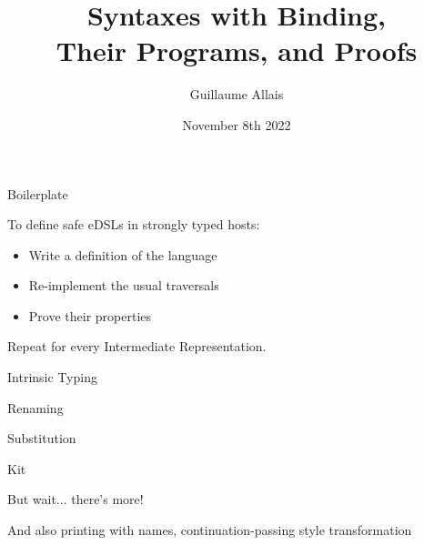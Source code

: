 \documentclass{beamer}
\title{Syntaxes with Binding,\\ Their Programs, and Proofs}
\author{Guillaume Allais}
\institute{University of Strathclyde}
\date{November 8th 2022}
\begin{document}
\maketitle

\begin{frame}{Boilerplate}

  To define safe eDSLs in strongly typed hosts:

  \bigskip

  \begin{itemize}
    \item Write a definition of the language
    \item Re-implement the usual traversals
    \item Prove their properties
  \end{itemize}

  \vfill

  Repeat for every Intermediate Representation.

\end{frame}

\begin{frame}{Intrinsic Typing}
  \vfill
\end{frame}

\begin{frame}{Renaming}
\end{frame}

\begin{frame}{Substitution}
\end{frame}

\begin{frame}{Kit}
  \vfill
\end{frame}


\begin{frame}{But wait... there's more!}

  \vfill

  And also printing with names,
  continuation-passing style transformation
\end{frame}
\end{document}
